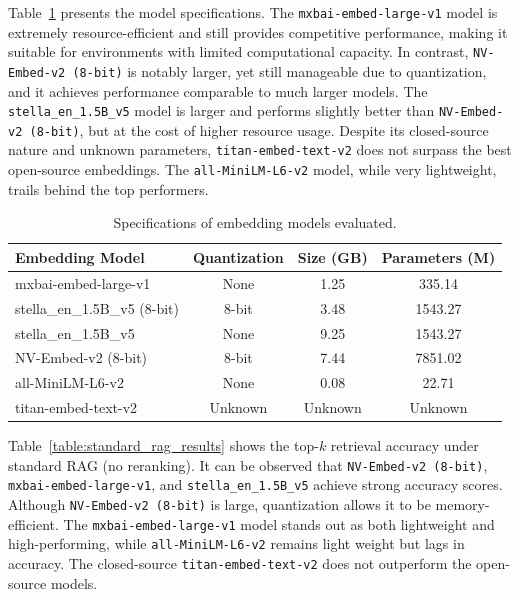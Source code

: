 \documentclass{scrartcl}
\begin{document}
Table~\ref{table:model_specs} presents the model specifications. The \texttt{mxbai-embed-large-v1} model is extremely resource-efficient and still provides competitive performance, making it suitable for environments with limited computational capacity. In contrast, \texttt{NV-Embed-v2 (8-bit)} is notably larger, yet still manageable due to quantization, and it achieves performance comparable to much larger models. The \texttt{stella\_en\_1.5B\_v5} model is larger and performs slightly better than \texttt{NV-Embed-v2 (8-bit)}, but at the cost of higher resource usage. Despite its closed-source nature and unknown parameters, \texttt{titan-embed-text-v2} does not surpass the best open-source embeddings. The \texttt{all-MiniLM-L6-v2} model, while very lightweight, trails behind the top performers.

\begin{table}[H]
\centering
\begin{tabular}{|l|c|c|c|}
\hline
\textbf{Embedding Model} & \textbf{Quantization} & \textbf{Size (GB)} & \textbf{Parameters (M)} \\ \hline
mxbai-embed-large-v1      & None   & 1.25 & 335.14 \\ \hline
stella\_en\_1.5B\_v5 (8-bit) & 8-bit & 3.48 & 1543.27 \\ \hline
stella\_en\_1.5B\_v5         & None  & 9.25 & 1543.27 \\ \hline
NV-Embed-v2 (8-bit)       & 8-bit & 7.44 & 7851.02 \\ \hline
all-MiniLM-L6-v2          & None  & 0.08 & 22.71 \\ \hline
titan-embed-text-v2       & Unknown & Unknown & Unknown \\ \hline
\end{tabular}
\caption{Specifications of embedding models evaluated.}
\label{table:model_specs}
\end{table}

Table~\ref{table:standard_rag_results} shows the top-$k$ retrieval accuracy under standard RAG (no reranking). It can be observed that \texttt{NV-Embed-v2 (8-bit)}, \texttt{mxbai-embed-large-v1}, and \texttt{stella\_en\_1.5B\_v5} achieve strong accuracy scores. Although \texttt{NV-Embed-v2 (8-bit)} is large, quantization allows it to be memory-efficient. The \texttt{mxbai-embed-large-v1} model stands out as both lightweight and high-performing, while \texttt{all-MiniLM-L6-v2} remains light weight but lags in accuracy. The closed-source \texttt{titan-embed-text-v2} does not outperform the open-source models.
\end{document}
